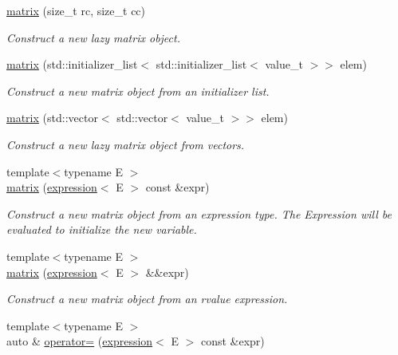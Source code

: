 \begin{DoxyCompactItemize}
\mbox{\hyperlink{classtest_1_1matrix_a1180d3216a2862c1352abc179ecb9e70}{matrix}} (size\+\_\+t rc, size\+\_\+t cc)
\begin{DoxyCompactList}\small\item\em Construct a new lazy matrix object. \end{DoxyCompactList}\item 
\mbox{\hyperlink{classtest_1_1matrix_ad0412fdd504edcd16c8ad6a0e6a41789}{matrix}} (std\+::initializer\+\_\+list$<$ std\+::initializer\+\_\+list$<$ value\+\_\+t $>$$>$ elem)
\begin{DoxyCompactList}\small\item\em Construct a new matrix object from an initializer list. \end{DoxyCompactList}\item 
\mbox{\hyperlink{classtest_1_1matrix_abf4537692c748dbec4ffdcc616e83592}{matrix}} (std\+::vector$<$ std\+::vector$<$ value\+\_\+t $>$$>$ elem)
\begin{DoxyCompactList}\small\item\em Construct a new lazy matrix object from vectors. \end{DoxyCompactList}\item 
{\footnotesize template$<$typename E $>$ }\\\mbox{\hyperlink{classtest_1_1matrix_a8ff0fb4c772493b77b89ad49e09673ea}{matrix}} (\mbox{\hyperlink{classtest_1_1expression}{expression}}$<$ E $>$ const \&expr)
\begin{DoxyCompactList}\small\item\em Construct a new matrix object from an expression type. The Expression will be evaluated to initialize the new variable. \end{DoxyCompactList}\item 
{\footnotesize template$<$typename E $>$ }\\\mbox{\hyperlink{classtest_1_1matrix_a828352ca5c85f6d1d6a4be23940d76e6}{matrix}} (\mbox{\hyperlink{classtest_1_1expression}{expression}}$<$ E $>$ \&\&expr)
\begin{DoxyCompactList}\small\item\em Construct a new matrix object from an rvalue expression. \end{DoxyCompactList}\item 
{\footnotesize template$<$typename E $>$ }\\auto \& \mbox{\hyperlink{classtest_1_1matrix_ac1ee57e3db511b178d37cff278d9eefd}{operator=}} (\mbox{\hyperlink{classtest_1_1expression}{expression}}$<$ E $>$ const \&expr)

\end{DoxyCompactItemize}

